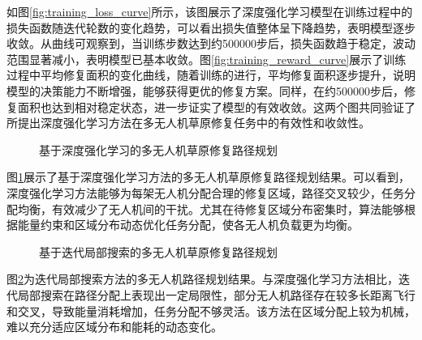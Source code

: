 \documentclass[AutoFakeBold]{LZUThesis}
\begin{document}
如图\ref{fig:training_loss_curve}所示，该图展示了深度强化学习模型在训练过程中的损失函数随迭代轮数的变化趋势，可以看出损失值整体呈下降趋势，表明模型逐步收敛。从曲线可观察到，当训练步数达到约500000步后，损失函数趋于稳定，波动范围显著减小，表明模型已基本收敛。图\ref{fig:training_reward_curve}展示了训练过程中平均修复面积的变化曲线，随着训练的进行，平均修复面积逐步提升，说明模型的决策能力不断增强，能够获得更优的修复方案。同样，在约500000步后，修复面积也达到相对稳定状态，进一步证实了模型的有效收敛。这两个图共同验证了所提出深度强化学习方法在多无人机草原修复任务中的有效性和收敛性。
\begin{figure}[H]
	\centering
	
	\caption{基于深度强化学习的多无人机草原修复路径规划}
	\label{fig:RL_combined_uav_routes}
\end{figure}

图\ref{fig:RL_combined_uav_routes}展示了基于深度强化学习方法的多无人机草原修复路径规划结果。可以看到，深度强化学习方法能够为每架无人机分配合理的修复区域，路径交叉较少，任务分配均衡，有效减少了无人机间的干扰。尤其在待修复区域分布密集时，算法能够根据能量约束和区域分布动态优化任务分配，使各无人机负载更为均衡。

\begin{figure}[H]
	\centering
	
	\caption{基于迭代局部搜索的多无人机草原修复路径规划}
	\label{fig:ILS_combined_uav_routes}
\end{figure}

图\ref{fig:ILS_combined_uav_routes}为迭代局部搜索方法的多无人机路径规划结果。与深度强化学习方法相比，迭代局部搜索在路径分配上表现出一定局限性，部分无人机路径存在较多长距离飞行和交叉，导致能量消耗增加，任务分配不够灵活。该方法在区域分配上较为机械，难以充分适应区域分布和能耗的动态变化。
\end{document}
